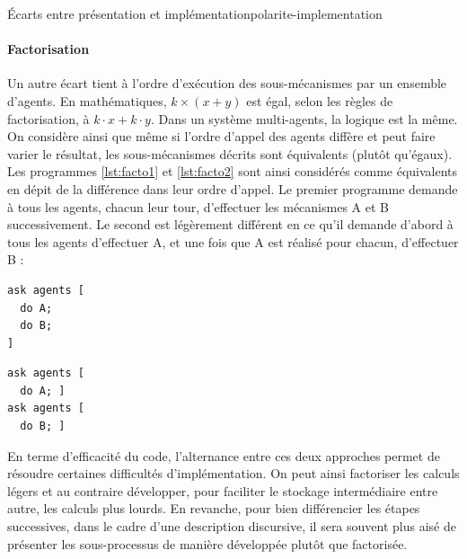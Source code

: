 \begin{encadre}{Écarts entre présentation et implémentation}{polarite-implementation}
\paragraph{Factorisation} Un autre écart tient à l'ordre d'exécution des sous-mécanismes par un ensemble d'agents.
En mathématiques, $k\times (x+y)$ est égal, selon les règles de factorisation, à $k{\cdot}x + k{\cdot}y$.
Dans un système multi-agents, la logique est la même.
On considère ainsi que même si l'ordre d'appel des agents diffère et peut faire varier le résultat, les sous-mécanismes décrits sont équivalents (plutôt qu'égaux).
Les programmes \ref{lst:facto1} et \ref{lst:facto2} sont ainsi considérés comme équivalents en dépit de la différence dans leur ordre d'appel.
Le premier programme demande à tous les agents, chacun leur tour, d'effectuer les mécanismes A et B successivement.
Le second est légèrement différent en ce qu'il demande d'abord à tous les agents d'effectuer A, et une fois que A est réalisé pour chacun, d'effectuer B : \bigskip

\noindent\begin{minipage}[b]{.45\textwidth}
	\begin{lstlisting}[caption={Factorisé},frame=tlrb, captionpos=b, label = {lst:facto1}]
ask agents [
  do A;
  do B;
]
	\end{lstlisting}
\end{minipage}\hfill
\begin{minipage}[b]{.45\textwidth}
	\begin{lstlisting}[caption={Développé},frame=tlrb, captionpos=b, label = {lst:facto2}]
ask agents [
  do A; ]
ask agents [
  do B; ]
	\end{lstlisting}
\end{minipage}

En terme d'efficacité du code, l'alternance entre ces deux approches permet de résoudre certaines difficultés d'implémentation.
On peut ainsi factoriser les calculs légers et au contraire développer, pour faciliter le stockage intermédiaire entre autre, les calculs plus lourds.
En revanche, pour bien différencier les étapes successives, dans le cadre d'une description discursive, il sera souvent plus aisé de présenter les sous-processus de manière développée plutôt que factorisée.


\end{encadre}
